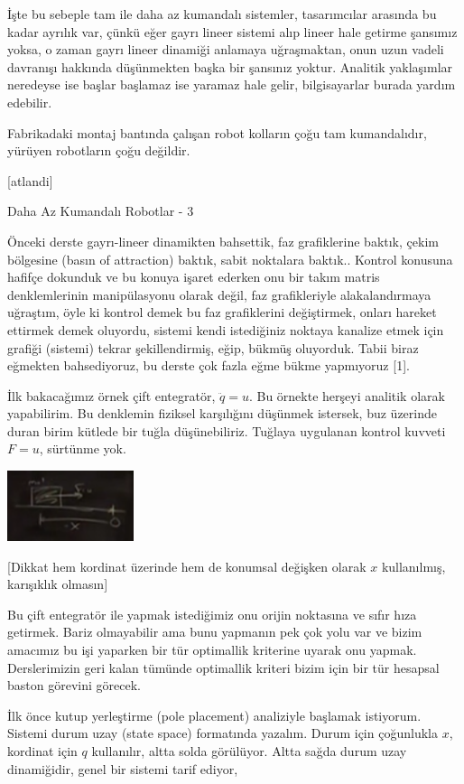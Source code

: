 \documentclass[12pt,fleqn]{article}\usepackage{../../common}
\begin{document}
İşte bu sebeple tam ile daha az kumandalı sistemler, tasarımcılar arasında
bu kadar ayrılık var, çünkü eğer gayrı lineer sistemi alıp lineer hale
getirme şansımız yoksa, o zaman gayrı lineer dinamiği anlamaya uğraşmaktan,
onun uzun vadeli davranışı hakkında düşünmekten başka bir şansınız
yoktur. Analitik yaklaşımlar neredeyse ise başlar başlamaz ise yaramaz hale
gelir, bilgisayarlar burada yardım edebilir.

Fabrikadaki montaj bantında çalışan robot kolların çoğu tam kumandalıdır,
yürüyen robotların çoğu değildir. 

[atlandi]

Daha Az Kumandalı Robotlar - 3

Önceki derste gayrı-lineer dinamikten bahsettik, faz grafiklerine baktık,
çekim bölgesine (basın of attraction) baktık, sabit noktalara baktık..
Kontrol konusuna hafifçe dokunduk ve bu konuya işaret ederken onu bir takım
matris denklemlerinin manipülasyonu olarak değil, faz grafikleriyle
alakalandırmaya uğraştım, öyle ki kontrol demek bu faz grafiklerini
değiştirmek, onları hareket ettirmek demek oluyordu, sistemi kendi
istediğiniz noktaya kanalize etmek için grafiği (sistemi) tekrar
şekillendirmiş, eğip, bükmüş oluyorduk. Tabii biraz eğmekten bahsediyoruz,
bu derste çok fazla eğme bükme yapmıyoruz [1]. 

İlk bakacağımız örnek çift entegratör, $\ddot{q} = u$. Bu örnekte herşeyi
analitik olarak yapabilirim. Bu denklemin fiziksel karşılığını düşünmek
istersek, buz üzerinde duran birim kütlede bir tuğla düşünebiliriz. Tuğlaya
uygulanan kontrol kuvveti $F = u$, sürtünme yok. 

\includegraphics[width=10em]{phy_control_01.png}

[Dikkat hem kordinat üzerinde hem de konumsal değişken olarak $x$
kullanılmış, karışıklık olmasın] 

Bu çift entegratör ile yapmak istediğimiz onu orijin noktasına ve sıfır
hıza getirmek. Bariz olmayabilir ama bunu yapmanın pek çok yolu var ve
bizim amacımız bu işi yaparken bir tür optimallik kriterine uyarak onu
yapmak. Derslerimizin geri kalan tümünde optimallik kriteri bizim için bir
tür hesapsal baston görevini görecek.

İlk önce kutup yerleştirme (pole placement) analiziyle başlamak
istiyorum. Sistemi durum uzay (state space) formatında yazalım. Durum için
çoğunlukla $x$, kordinat için $q$ kullanılır, altta solda görülüyor. Altta
sağda durum uzay dinamiğidir, genel bir sistemi tarif ediyor,
\end{document}
